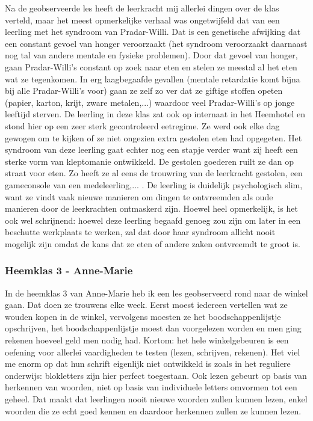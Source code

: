 \documentclass[a4paper,11pt]{article}
\theoremstyle{definition}
\begin{document}
\begin{itemize}
\begin{itemize}
\noindent Na de geobserveerde les heeft de leerkracht mij allerlei dingen over de klas 
verteld, maar het meest opmerkelijke verhaal was ongetwijfeld dat van een 
leerling met het syndroom van Pradar-Willi. Dat is een genetische afwijking 
dat een constant gevoel van honger veroorzaakt (het syndroom veroorzaakt daarnaast nog tal van andere mentale en fysieke 
problemen). Door dat gevoel van honger, gaan Pradar-Willi's constant op zoek 
naar eten en stelen ze meestal al het eten wat ze tegenkomen. In erg laagbegaafde gevallen (mentale retardatie komt bijna bij alle Pradar-Willi's voor) gaan ze zelf
zo ver dat ze giftige stoffen opeten (papier, karton, krijt, zware metalen,...) waardoor veel Pradar-Willi's op jonge leeftijd sterven. De leerling in 
deze klas zat ook op internaat in het Heemhotel en stond hier op een zeer sterk gecontroleerd eetregime. Ze werd ook elke dag gewogen om te 
kijken of ze niet ongezien extra gestolen eten had opgegeten. Het syndroom van 
deze leerling gaat echter nog een stapje verder want zij heeft een sterke vorm 
van kleptomanie ontwikkeld. De gestolen goederen ruilt ze dan op straat voor eten. Zo heeft ze al eens de trouwring van de leerkracht 
gestolen, een gameconsole van een medeleerling,... . De leerling is duidelijk 
psychologisch slim, want ze vindt vaak nieuwe manieren om dingen te ontvreemden 
als oude manieren door de leerkrachten ontmaskerd zijn. Hoewel heel opmerkelijk, 
is het ook wel schrijnend: hoewel deze leerling begaafd genoeg zou zijn om later 
in een beschutte werkplaats te werken, zal dat door haar syndroom allicht nooit 
mogelijk zijn omdat de kans dat ze eten of andere zaken ontvreemdt te groot is.

\subsubsection{Heemklas 3 - Anne-Marie}
In de heemklas 3 van Anne-Marie heb ik een les geobserveerd rond naar de winkel 
gaan. Dat doen ze trouwens elke week. Eerst moest iedereen vertellen wat ze wouden kopen in de winkel, vervolgens moesten ze het boodschappenlijstje 
opschrijven, het boodschappenlijstje moest dan voorgelezen worden en men ging rekenen 
hoeveel geld men nodig had. Kortom: het hele winkelgebeuren is een oefening voor 
allerlei vaardigheden te testen (lezen, schrijven, rekenen). Het viel me enorm 
op dat hun schrift eigenlijk niet ontwikkeld is zoals in het reguliere 
onderwijs: blokletters zijn hier perfect toegestaan. Ook lezen gebeurt op basis 
van herkennen van woorden, niet op basis van individuele letters omvormen tot 
een geheel. Dat maakt dat leerlingen nooit nieuwe woorden zullen kunnen lezen, 
enkel woorden die ze echt goed kennen en daardoor herkennen zullen ze kunnen lezen. 


\end{itemize}
\end{itemize}
\end{document}
